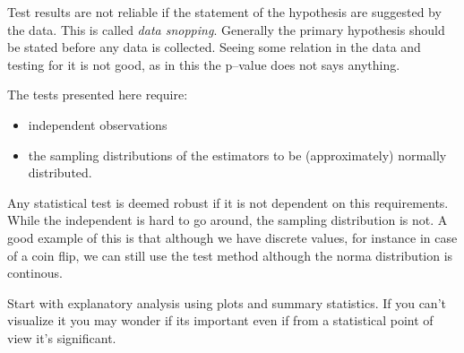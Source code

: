 Test results are not reliable if the statement of the hypothesis are suggested
by the data. This is called \emph{data snopping}. Generally the primary
hypothesis should be stated before any data is collected. Seeing some relation
in the data and testing for it is not good, as in this the p--value does not
says anything.

The tests presented here require:

\begin{itemize}
  \item independent observations
  \item the sampling distributions of the estimators to be (approximately)
  normally distributed.
\end{itemize}

Any statistical test is deemed robust if it is not dependent on this
requirements. While the independent is hard to go around, the sampling
distribution is not. A good example of this is that although we have discrete
values, for instance in case of a coin flip, we can still use the test method
although the norma distribution is continous.

Start with explanatory analysis using plots and summary statistics. If you can't
visualize it you may wonder if its important even if from a statistical point of
view it's significant.